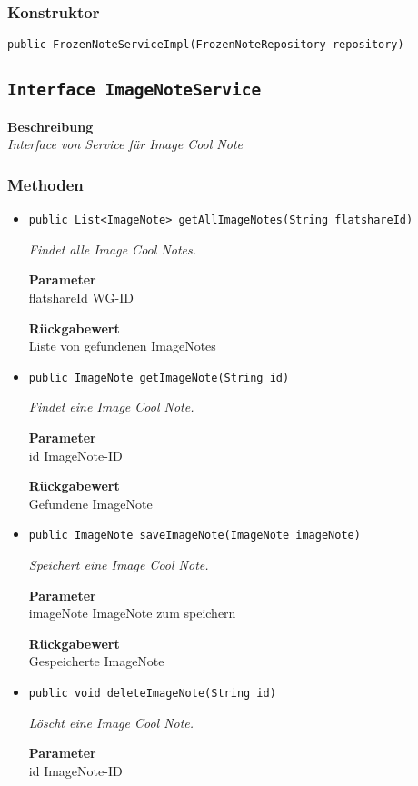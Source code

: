     \subsubsection*{Konstruktor}
    \texttt{public FrozenNoteServiceImpl(FrozenNoteRepository repository)}
    \subsection{\texttt{Interface ImageNoteService}}
    \textbf{Beschreibung} \\
    \textit{Interface von Service für Image Cool Note}
    \subsubsection*{Methoden}
    \begin{itemize}
    	\item{\texttt{public List<ImageNote> getAllImageNotes(String flatshareId)}}
    	
    	\textit{Findet alle Image Cool Notes.}
    	
    	\textbf{Parameter} \\
    	flatshareId WG-ID
    	
    	\textbf{Rückgabewert} \\
    	Liste von gefundenen ImageNotes        \item{\texttt{public ImageNote getImageNote(String id)}}
    	
    	\textit{Findet eine Image Cool Note.}
    	
    	\textbf{Parameter} \\
    	id ImageNote-ID
    	
    	\textbf{Rückgabewert} \\
    	Gefundene ImageNote        \item{\texttt{public ImageNote saveImageNote(ImageNote imageNote)}}
    	
    	\textit{Speichert eine Image Cool Note.}
    	
    	\textbf{Parameter} \\
    	imageNote ImageNote zum speichern
    	
    	\textbf{Rückgabewert} \\
    	Gespeicherte ImageNote        \item{\texttt{public void deleteImageNote(String id)}}
    	
    	\textit{Löscht eine Image Cool Note.}
    	
    	\textbf{Parameter} \\
    	id ImageNote-ID
    	
    	
    \end{itemize}
